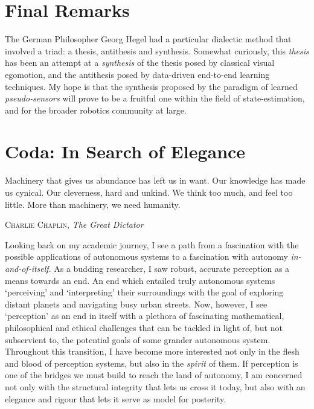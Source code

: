 \section{Final Remarks}

The German Philosopher Georg Hegel had a particular dialectic method that involved a triad: a thesis, antithesis and synthesis.
Somewhat curiously, this \textit{thesis} has been an attempt at a \textit{synthesis} of the thesis posed by classical visual egomotion, and the antithesis posed by data-driven end-to-end learning techniques.
My hope is that the synthesis proposed by the paradigm of learned \textit{pseudo-sensors} will prove to be a fruitful one within the field of state-estimation, and for the broader robotics community at large. 

\section{Coda: In Search of Elegance}
\epigraph{Machinery that gives us abundance has left us in want.
Our knowledge has made us cynical.
Our cleverness, hard and unkind.
We think too much, and feel too little.
More than machinery, we need humanity.}{\textsc{Charlie Chaplin}, \textit{The Great Dictator}}


Looking back on my academic journey, I see a path from a fascination with the possible applications of autonomous systems to a fascination with autonomy \textit{in-and-of-itself}. As a budding researcher, I saw robust, accurate perception as a means towards an end. An end which entailed truly autonomous systems `perceiving' and `interpreting' their surroundings with the goal of exploring distant planets and navigating busy urban streets. Now, however, I see `perception' as an end in itself with a plethora of fascinating mathematical, philosophical and ethical challenges that can be tackled in light of, but not subservient to, the potential goals of some grander autonomous system. Throughout this transition, I have become more interested not only in the flesh and blood of perception systems, but also in the \textit{spirit} of them. If perception is one of the bridges we must build to reach the land of autonomy, I am concerned not only with the structural integrity that lets us cross it today, but also with an elegance and rigour that lets it serve as model for posterity. 

